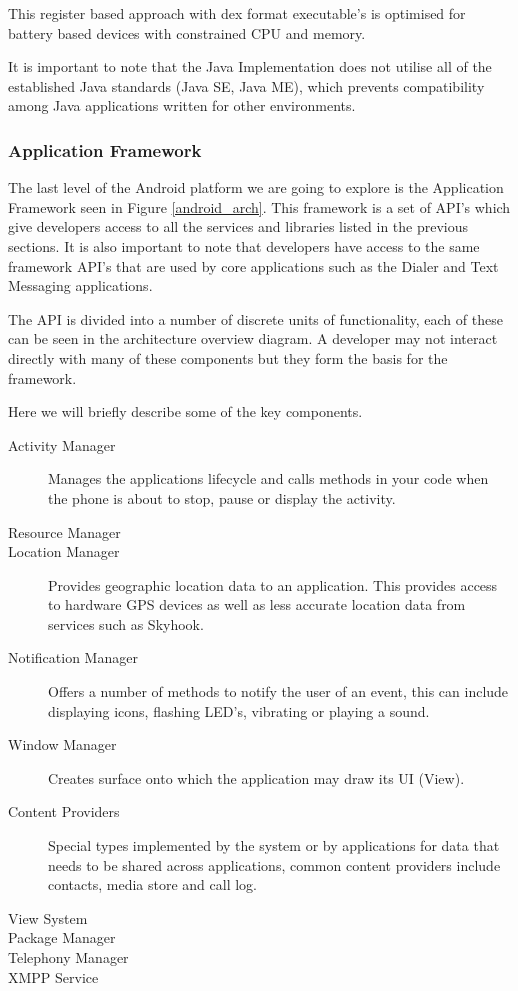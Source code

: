 This register based approach with dex format executable’s is optimised for battery based devices with constrained CPU and memory. 

It is important to note that the Java Implementation does not utilise all of the established Java standards (Java SE, Java ME), which prevents compatibility among Java applications written for other environments.

\subsubsection{Application Framework}
The last level of the Android platform we are going to explore is the Application Framework seen in Figure \ref{android_arch}. This framework is a set of API’s which give developers access to all the services and libraries listed in the previous sections. It is also important to note that developers have access to the same framework API’s that are used by core applications such as the Dialer and Text Messaging applications.

The API is divided into a number of discrete units of functionality, each of these can be seen in the architecture overview diagram. A developer may not interact directly with many of these components but they form the basis for the framework.

Here we will briefly describe some of the key components.

\begin{description}
\item[Activity Manager] Manages the applications lifecycle and calls methods in your code when the phone is about to stop, pause or display the activity.
\item[Resource Manager] 
\item[Location Manager] Provides geographic location data to an application. This provides access to hardware GPS devices as well as less accurate location data from services such as Skyhook.
\item[Notification Manager] Offers a number of methods to notify the user of an event, this can include displaying icons, flashing LED’s, vibrating or playing a sound.
\item[Window Manager] Creates surface onto which the application may draw its UI (View).
\item[Content Providers] Special types implemented by the system or by applications for data that needs to be shared across applications, common content providers include contacts, media store and call log.
\item[View System]
\item[Package Manager]
\item[Telephony Manager]
\item[XMPP Service]
\end{description}



